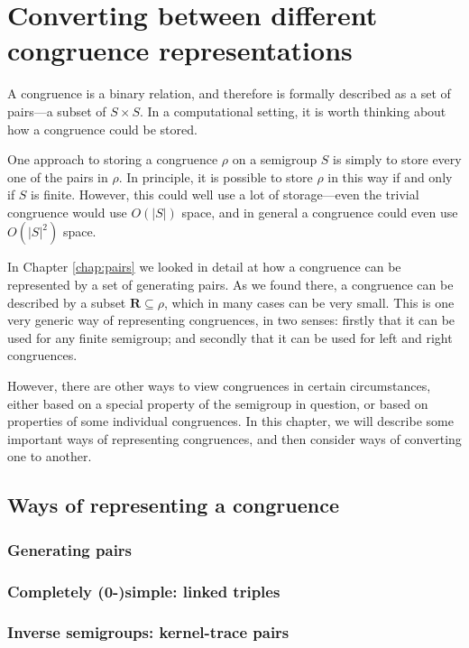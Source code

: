 \chapter{Converting between different congruence representations}
\label{chap:converting}

A congruence is a binary relation, and therefore is formally described as a set
of pairs---a subset of $S \times S$.  In a computational setting, it is worth
thinking about how a congruence could be stored.

One approach to storing a congruence $\rho$ on a semigroup $S$ is simply to
store every one of the pairs in $\rho$.  In principle, it is possible to store
$\rho$ in this way if and only if $S$ is finite.  However, this could well use a
lot of storage---even the trivial congruence would use $O(|S|)$ space, and in
general a congruence could even use $O(|S|^2)$ space.

In Chapter \ref{chap:pairs} we looked in detail at how a congruence can be
represented by a set of generating pairs.  As we found there, a congruence can
be described by a subset $\mathbf{R} \subseteq \rho$, which in many cases can be
very small.  This is one very generic way of representing congruences, in two
senses: firstly that it can be used for any finite semigroup; and secondly that
it can be used for left and right congruences.

However, there are other ways to view congruences in certain circumstances,
either based on a special property of the semigroup in question, or based on
properties of some individual congruences.  In this chapter, we will describe
some important ways of representing congruences, and then consider ways of
converting one to another.

\section{Ways of representing a congruence}
\subsection{Generating pairs}
\subsection{Completely (0-)simple: linked triples}
\subsection{Inverse semigroups: kernel-trace pairs}
